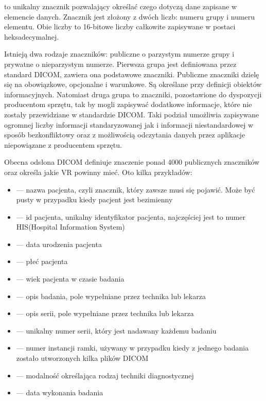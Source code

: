 \par
{} to unikalny znacznik pozwalający określać czego dotyczą dane zapisane w elemencie danych.
Znacznik jest złożony z dwóch liczb: numeru grupy i numeru elementu.
Obie liczby to 16-bitowe liczby całkowite zapisywane w postaci  heksadecymalnej.

\par
Istnieją dwa rodzaje znaczników: publiczne o parzystym numerze grupy i prywatne o nieparzystym numerze.
Pierwsza grupa jest definiowana przez standard DICOM, zawiera ona podstawowe znaczniki.
Publiczne znaczniki dzielę się na obowiązkowe, opcjonalne i warunkowe.
Są określane przy definicji obiektów informacyjnych.
Natomiast druga grupa to znaczniki, pozostawione do dyspozycji producentom sprzętu, tak by mogli zapisywać dodatkowe informacje, które nie zostały przewidziane w standardzie DICOM.
Taki podział umożliwia zapisywane ogromnej liczby informacji standaryzowanej jak i informacji niestandardowej w sposób bezkonfliktowy oraz z możliwością odczytania danych przez aplikacje niepowiązane z producentem sprzętu.

\par
Obecna odsłona DICOM definiuje znaczenie ponad 4000 publicznych znaczników oraz określa jakie VR powinny mieć.
Oto kilka przykładów:
\begin{itemize}
    \item {} --- nazwa pacjenta, czyli znacznik, który zawsze musi się pojawić.
          Może być pusty w przypadku kiedy pacjent jest bezimienny
    \item {} --- id pacjenta, unikalny identyfikator pacjenta, najczęściej jest to numer HIS(Hospital Information System)
    \item {} --- data urodzenia pacjenta
    \item {} --- płeć pacjenta
    \item {} --- wiek pacjenta w czasie badania
    \item {} --- opis badania, pole wypełniane przez technika lub lekarza
    \item {} --- opis serii, pole wypełniane przez technika lub lekarza
    \item {} --- unikalny numer serii, który jest nadawany każdemu badaniu
    \item {} --- numer instancji ramki, używany w przypadku kiedy z jednego badania zostało utworzonych kilka plików DICOM
    \item {} --- modalność określająca rodzaj techniki diagnostycznej
    \item {} --- data wykonania badania
\end{itemize}


